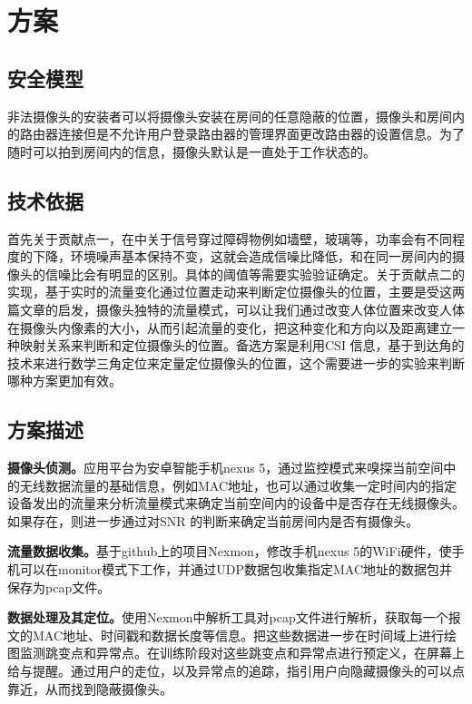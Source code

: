 \documentclass[UTF8]{ctexart}
\begin{document}
\section{方案}
\subsection{安全模型}
非法摄像头的安装者可以将摄像头安装在房间的任意隐蔽的位置，摄像头和房间内的路由器连接但是不允许用户登录路由器的管理界面更改路由器的设置信息。为了随时可以拍到房间内的信息，摄像头默认是一直处于工作状态的。

\subsection{技术依据}
首先关于贡献点一，在\cite{TW-See}中关于信号穿过障碍物例如墙壁，玻璃等，功率会有不同程度的下降，环境噪声基本保持不变，这就会造成信噪比降低，和在同一房间内的摄像头的信噪比会有明显的区别。具体的阈值等需要实验验证确定。关于贡献点二的实现，基于实时的流量变化通过位置走动来判断定位摄像头的位置，主要是受这两篇文章\cite{DeWiCam}\cite{HomeSpy}的启发，摄像头独特的流量模式，可以让我们通过改变人体位置来改变人体在摄像头内像素的大小，从而引起流量的变化，把这种变化和方向以及距离建立一种映射关系来判断和定位摄像头的位置。备选方案是利用CSI 信息，基于到达角的技术来进行数学三角定位来定量定位摄像头的位置，这个需要进一步的实验来判断哪种方案更加有效。

\subsection{方案描述}
\textbf{摄像头侦测。}应用平台为安卓智能手机nexus 5，通过监控模式来嗅探当前空间中的无线数据流量的基础信息，例如MAC地址，也可以通过收集一定时间内的指定设备发出的流量来分析流量模式来确定当前空间内的设备中是否存在无线摄像头。如果存在，则进一步通过对SNR 的判断来确定当前房间内是否有摄像头。

\textbf{流量数据收集。}基于github上的项目Nexmon，修改手机nexus 5的WiFi硬件，使手机可以在monitor模式下工作，并通过UDP数据包收集指定MAC地址的数据包并保存为pcap文件。

\textbf{数据处理及其定位。}使用Nexmon中解析工具对pcap文件进行解析，获取每一个报文的MAC地址、时间戳和数据长度等信息。把这些数据进一步在时间域上进行绘图监测跳变点和异常点。在训练阶段对这些跳变点和异常点进行预定义，在屏幕上给与提醒。通过用户的走位，以及异常点的追踪，指引用户向隐藏摄像头的可以点靠近，从而找到隐蔽摄像头。
\end{document}
